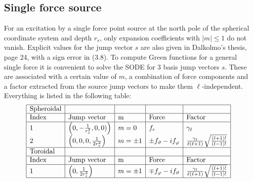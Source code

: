 \documentclass[12pt,a4paper]{article}
\begin{document}
\subsection{Single force source}
%
For an excitation by a single force point source at the north pole of the spherical coordinate system and depth $r_s$, only expansion coefficients with $|m| \le 1$ do not vanish. Explicit values for the jump vector $s$ are also given in Dalkolmo's thesis, page 24, with a sign error in (3.8). To compute Green functions for a general single force it is convenient to solve the SODE for 3 basis jump vectors $s$. These are associated with a certain value of $m$, a combination of force components and a factor extracted from the source jump vectors to make them $\ell$-independent. Everything is listed in the following table:
\begin{displaymath}
\begin{array}{|l|l|l|l|l|}\hline
\mbox{Spheroidal} & & & & \\ \hline
\mbox{Index} & \mbox{Jump vector} & $m$ & \mbox{Force} & \mbox{Factor} \\ \hline
1 & \left(0, -\frac{1}{r_s^2}, 0, 0)\right) & m=0 & f_r & \gamma_\ell \\
2 & \left(0, 0, 0,\frac{1}{2r_s^2}\right) & m=\pm 1 & \pm f_\vartheta-if_\varphi & \frac{\gamma_\ell}{\ell(\ell+1)}\sqrt{\frac{(l+1)!}{(l-1)!}} \\ \hline
\mbox{Toroidal} & & & & \\ \hline
\mbox{Index} & \mbox{Jump vector} & $m$ & \mbox{Force} & \mbox{Factor} \\ \hline
1 & \left(0, \frac{1}{2r_s^2}\right) & m=\pm 1 & \mp f_\varphi-if_\vartheta & \frac{\gamma_\ell}{\ell(\ell+1)}\sqrt{\frac{(l+1)!}{(l-1)!}} \\ \hline
\end{array}
\end{displaymath}
\end{document}
